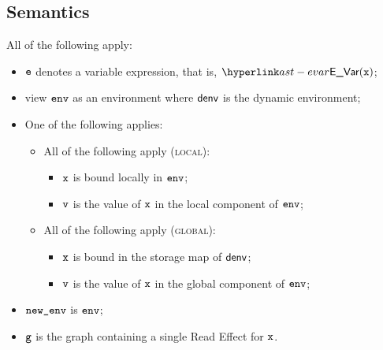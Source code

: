 \subsection{Semantics}
\ProseParagraph
All of the following apply:
\begin{itemize}
  \item $\ve$ denotes a variable expression, that is, $\EVar(\vx)$;
  \item view $\env$ as an environment where $\denv$ is the dynamic environment;
  \item One of the following applies:
  \begin{itemize}
    \item All of the following apply (\textsc{local}):
    \begin{itemize}
      \item $\vx$ is bound locally in $\env$;
      \item $\vv$ is the value of $\vx$ in the local component of $\env$;
    \end{itemize}

    \item All of the following apply (\textsc{global}):
    \begin{itemize}
      \item $\vx$ is bound in the storage map of $\denv$;
      \item $\vv$ is the value of $\vx$ in the global component of $\env$;
    \end{itemize}
  \end{itemize}
  \item $\newenv$ is $\env$;
  \item $\vg$ is the graph containing a single Read Effect for $\vx$.
\end{itemize}

\FormallyParagraph
\begin{mathpar}
\end{mathpar}

\begin{mathpar}
\end{mathpar}

